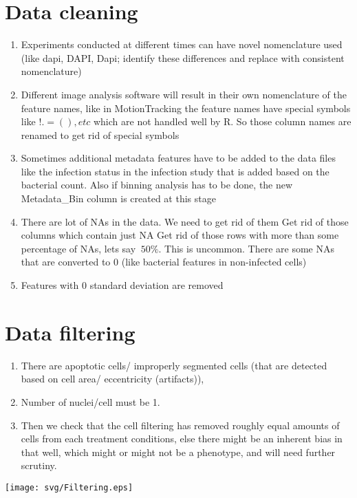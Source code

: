 \documentclass[12pt]{article}
\begin{document}
\section{Data cleaning}
	\begin{enumerate}
		\item Experiments conducted at different times can have novel nomenclature used (like dapi, DAPI, Dapi; identify these differences and replace with consistent nomenclature)
		\item Different image analysis software will result in their own nomenclature of the feature names, like in MotionTracking the feature names have special symbols like $! . = ( ), etc$ which are not handled well by R. So those column names are renamed to get rid of special symbols
		\item Sometimes additional metadata features have to be added to the data files like the infection status in the infection study that is added based on the bacterial count. Also if binning analysis has to be done, the new Metadata\_Bin column is created at this stage
		\item There are lot of NAs in the data. We need to get rid of them
			\subitem Get rid of those columns which contain just NA
			\subitem Get rid of those rows with more than some percentage of NAs, lets say $~ 50\%$. This is uncommon.
			\subitem There are some NAs that are converted to 0 (like bacterial features in non-infected cells)
		\item Features with 0 standard deviation are removed
	\end{enumerate}


\section{Data filtering}
\begin{enumerate}
	\item There are apoptotic cells/ improperly segmented cells (that are detected based on cell area/ eccentricity (artifacts)), 
	\item Number of nuclei/cell must be 1.
	\item Then we check that the cell filtering has removed roughly equal amounts of cells from each treatment conditions, else there might be an inherent bias in that well, which might or might not be a phenotype, and will need further scrutiny. 
\end{enumerate}
	\begin{center} \texttt{[image: svg/Filtering.eps]} \end{center}
	
\end{document}
